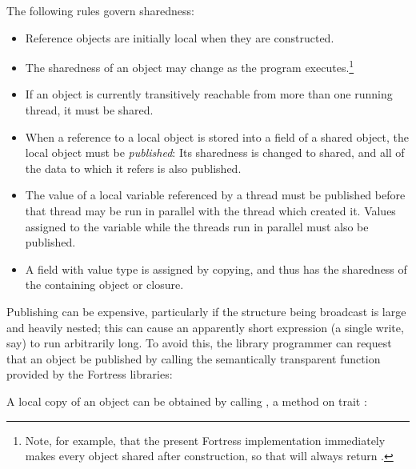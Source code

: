 The following rules govern sharedness:
\begin{itemize}
\item Reference objects are initially local when they are constructed.
\item The sharedness of an object may change as the program executes.\footnote{Note, for example, that the present Fortress implementation immediately makes every object shared after construction, so that  will always return .}
\item If an object is currently transitively reachable from more than
  one running thread, it must be shared.
\item When a reference to a local object is stored into a field of a
  shared object, the local object must be \emph{published}: Its
  sharedness is changed to shared, and all of the data to which it
  refers is also published.
\item The value of a local variable referenced by a thread must be
  published before that thread may be run in parallel with the thread
  which created it.  Values assigned to the variable while the
  threads run in parallel must also be published.
\item A field with value type is assigned by copying, and thus has the
   sharedness of the containing object or closure.
\end{itemize}

Publishing can be expensive, particularly if the structure being
broadcast is large and heavily nested; this can cause an apparently
short  expression (a single write, say) to run arbitrarily
long.  To avoid this, the library programmer can request that an
object be published by calling the semantically transparent function
 provided by the Fortress libraries:

A local copy of an object can be obtained by calling , a
method on trait :

